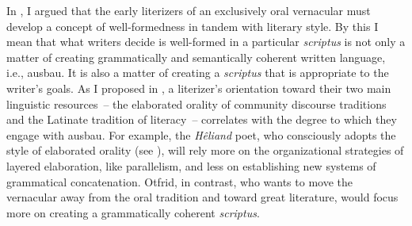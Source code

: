 In , I argued that the early literizers of an exclusively oral vernacular must develop a concept of well-formedness in tandem with literary style. By this I mean that what writers decide is well-formed in a particular \textit{scriptus} is not only a matter of creating grammatically and semantically coherent written language, i.e., ausbau. It is also a matter of creating a \textit{scriptus} that is appropriate to the writer’s goals. As I proposed in , a literizer’s orientation toward their two main linguistic resources~-- the elaborated orality of community discourse traditions and the Latinate tradition of literacy~-- correlates with the degree to which they engage with ausbau. For example, the \textit{Hêliand} poet, who consciously adopts the style of elaborated orality (see ), will rely more on the organizational strategies of layered elaboration, like parallelism, and less on establishing new systems of grammatical concatenation. Otfrid, in contrast, who wants to move the vernacular away from the oral tradition and toward great literature, would focus more on creating a grammatically coherent \textit{scriptus}.

